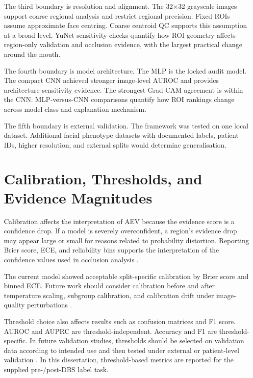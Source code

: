 The third boundary is resolution and alignment. The 32$\times$32 grayscale images support coarse regional analysis and restrict regional precision. Fixed ROIs assume approximate face centring. Coarse centroid QC supports this assumption at a broad level. YuNet sensitivity checks quantify how ROI geometry affects region-only validation and occlusion evidence, with the largest practical change around the mouth.


The fourth boundary is model architecture. The MLP is the locked audit model. The compact CNN achieved stronger image-level AUROC and provides architecture-sensitivity evidence. The strongest Grad-CAM agreement is within the CNN. MLP-versus-CNN comparisons quantify how ROI rankings change across model class and explanation mechanism.


The fifth boundary is external validation. The framework was tested on one local dataset. Additional facial phenotype datasets with documented labels, patient IDs, higher resolution, and external splits would determine generalisation.


\section{Calibration, Thresholds, and Evidence Magnitudes}

Calibration affects the interpretation of AEV because the evidence score is a confidence drop. If a model is severely overconfident, a region's evidence drop may appear large or small for reasons related to probability distortion. Reporting Brier score, ECE, and reliability bins supports the interpretation of the confidence values used in occlusion analysis  .


The current model showed acceptable split-specific calibration by Brier score and binned ECE. Future work should consider calibration before and after temperature scaling, subgroup calibration, and calibration drift under image-quality perturbations .


Threshold choice also affects results such as confusion matrices and F1 score. AUROC and AUPRC are threshold-independent. Accuracy and F1 are threshold-specific. In future validation studies, thresholds should be selected on validation data according to intended use and then tested under external or patient-level validation . In this dissertation, threshold-based metrics are reported for the supplied pre-/post-DBS label task.


